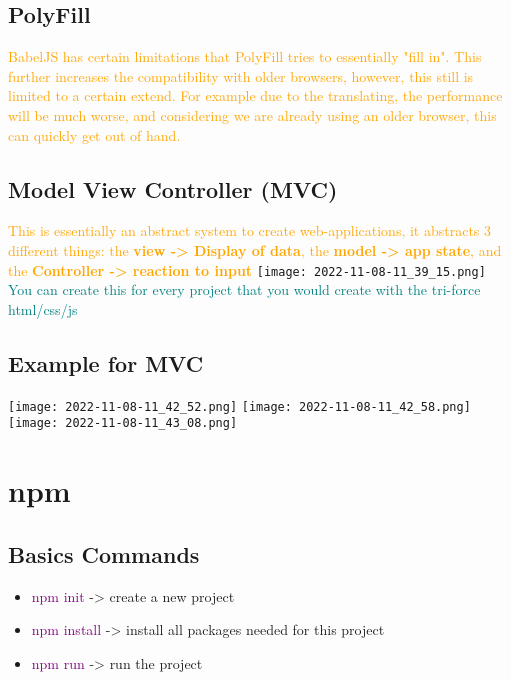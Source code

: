 \documentclass[main.tex,fontsize=6pt,paper=a4,paper=landscape,DIV=calc,]{scrartcl}
\begin{document}
\begin{multicols*}{4}
\subsection{PolyFill} 
\textcolor{orange}{BabelJS has certain limitations that PolyFill tries to essentially "fill in". This further increases the compatibility with older browsers, however, this still is limited to a certain extend.\newline
For example due to the translating, the performance will be much worse, and considering we are already using an older browser, this can quickly get out of hand.}

\subsection{Model View Controller (MVC)}  
\textcolor{orange}{This is essentially an abstract system to create web-applications, it abstracts 3 different things: the \textbf{view -> Display of data}, the \textbf{model -> app state}, and the \textbf{Controller -> reaction to input}}\newline
\texttt{[image: 2022-11-08-11\_39\_15.png]}\newline
\textcolor{teal}{You can create this for every project that you would create with the tri-force html/css/js}

\subsection{Example for MVC}  
\texttt{[image: 2022-11-08-11\_42\_52.png]}\newline
\texttt{[image: 2022-11-08-11\_42\_58.png]}
\texttt{[image: 2022-11-08-11\_43\_08.png]}


\section{npm}

\subsection{Basics Commands}  
\begin{itemize}
\item \textcolor{purple}{npm init} -> create a new project
\item \textcolor{purple}{npm install} -> install all packages needed for this project
\item \textcolor{purple}{npm run} -> run the project
\end{itemize} 


\end{multicols*}
\end{document}
